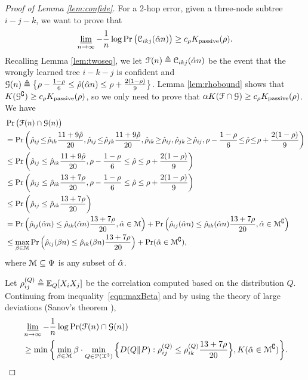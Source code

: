 \begin{proof}[Proof of Lemma \ref{lem:confide}]
	For a 2-hop error, given a three-node subtree $i-j-k$, we want to prove  that
	\begin{align}
    	\varliminf_{n\rightarrow\infty}-\frac{1}{n}\log\Pr\big(\mathcal{C}_{ikj}(\hat{\alpha} n)\big)\geq c_{\rho}K _{{\rm passive}}(\rho).
	\end{align}
	Recalling Lemma \ref{lem:twoseq}, we let $\mathcal{F}(n)\triangleq\mathcal{C}_{ikj}(\hat{\alpha} n)$ be the event that the wrongly learned tree $i-k-j$ is confident and $\mathcal{G}(n)\triangleq\big\{\rho-\frac{1-\rho}{6}\leq\hat{\rho}(\hat{\alpha} n)\leq\rho+\frac{2(1-\rho)}{9}\big\}$. Lemma \ref{lem:rhobound} shows that $K (\mathcal{G}^{\complement})\geq c_{\rho}K _{{\rm passive}}(\rho)$, so we only need to prove that $\alpha K (\mathcal{F}\cap \mathcal{G})\geq c_{\rho}K _{{\rm passive}}(\rho)$. We have 
	\begin{align}
		&\Pr\big(\calF(n)\cap \calG(n)\big)\nonumber\\
		&=\Pr\bigg(\hrho_{ij}\!\leq\! \hrho_{ik}\frac{11+9\hrho}{20},\hrho_{ij}\!\leq\! \hrho_{jk}\frac{11+9\hrho}{20},\hrho_{ik}\!\geq\! \hrho_{ij},\hrho_{jk}\!\geq\! \hrho_{ij},\rho-\frac{1-\rho}{6}\!\leq\!\hrho\!\leq\!\rho+\frac{2(1-\rho)}{9}\bigg)\\
		&\leq\Pr\bigg(\hrho_{ij}\leq \hrho_{ik}\frac{11+9\hrho}{20}, \rho-\frac{1-\rho}{6}\leq\hrho\leq\rho+\frac{2(1-\rho)}{9}\bigg)\\
		&\leq\Pr\bigg(\hrho_{ij}\leq \hrho_{ik}\frac{13+7\rho}{20}, \rho-\frac{1-\rho}{6}\leq\hrho\leq\rho+\frac{2(1-\rho)}{9}\bigg)\\
		&\leq\Pr\bigg(\hrho_{ij}\leq \hrho_{ik}\frac{13+7\rho}{20}\bigg)\\
		&=\Pr\Big(\hrho_{ij}(\halpha n)\leq \hrho_{ik}(\halpha n)\frac{13+7\rho}{20}, \halpha\in \calM\Big)+\Pr\Big(\hrho_{ij}(\halpha n)\leq \hrho_{ik}(\halpha n)\frac{13+7\rho}{20}, \halpha\in \calM^{\complement}\Big) \\
		&\leq \max_{\beta\in \calM}\Pr\Big(\hrho_{ij}(\beta n)\leq \hrho_{ik}(\beta n)\frac{13+7\rho}{20}\Big)+\Pr( \halpha\in \calM^{\complement}), \label{eqn:maxBeta}
	\end{align}
	where $\mathcal{M}\subseteq \Psi$ is any  subset of $\hat{\alpha}$.
	
	Let $\rho^{(Q)}_{ij}\triangleq\mathbb{E}_Q[X_iX_j]$ be the correlation computed based on the distribution $Q$. Continuing from inequality~\eqref{eqn:maxBeta} and  by using the theory of large deviations (Sanov's theorem \cite{zeitouni1998large}), 
	\begin{align}
		&\varliminf_{n\rightarrow\infty}-\frac{1}{n}\log\Pr(\mathcal{F}(n)\cap \mathcal{G}(n))\nonumber\\*
		&\geq \min\bigg\{\min_{\beta\in \mathcal{M}} \beta\cdot \min_{Q\in\mathcal{P}(\mathcal{X}^{3})} \Big\{D(Q\|P):\rho^{(Q)}_{ij}\leq\rho^{(Q)}_{ik}\frac{13+7\rho}{20}\Big\},K (\hat{\alpha}\in \mathcal{M}^{\complement})\bigg\}. \label{eqn:mink}
	\end{align}


\end{proof}

